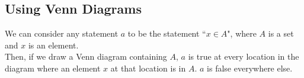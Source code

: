 \documentclass{article}
\begin{document}
\subsection{\sc Using Venn Diagrams}
We can consider any statement $a$ to be the statement ``$x\in A$", where $A$ is a set and $x$ is an element.\\[1ex]
Then, if we draw a Venn diagram containing $A$, $a$ is true at every location in the diagram where an element $x$ at that location is in $A$. $a$ is false everywhere else.
\begin{center}
\end{center}
\end{document}
